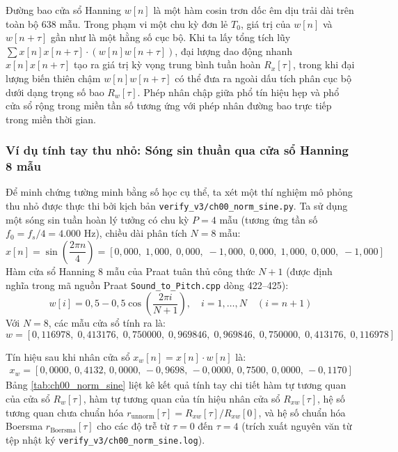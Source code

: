 Đường bao cửa sổ Hanning $w[n]$ là một hàm cosin trơn dốc êm dịu trải dài trên toàn bộ 638 mẫu. Trong phạm vi một chu kỳ đơn lẻ $T_0$, giá trị của $w[n]$ và $w[n+\tau]$ gần như là một hằng số cục bộ. Khi ta lấy tổng tích lũy $\sum x[n] x[n+\tau] \cdot (w[n] w[n+\tau])$, đại lượng dao động nhanh $x[n] x[n+\tau]$ tạo ra giá trị kỳ vọng trung bình tuần hoàn $R_x[\tau]$, trong khi đại lượng biến thiên chậm $w[n] w[n+\tau]$ có thể đưa ra ngoài dấu tích phân cục bộ dưới dạng trọng số bao $R_w[\tau]$. Phép nhân chập giữa phổ tín hiệu hẹp và phổ cửa sổ rộng trong miền tần số tương ứng với phép nhân đường bao trực tiếp trong miền thời gian.

\subsubsection*{Ví dụ tính tay thu nhỏ: Sóng sin thuần qua cửa sổ Hanning 8 mẫu}
Để minh chứng tường minh bằng số học cụ thể, ta xét một thí nghiệm mô phỏng thu nhỏ được thực thi bởi kịch bản \texttt{verify\_v3/ch00\_norm\_sine.py}. Ta sử dụng một sóng sin tuần hoàn lý tưởng có chu kỳ $P = 4$ mẫu (tương ứng tần số $f_0 = f_s / 4 = 4.000\text{ Hz}$), chiều dài phân tích $N = 8$ mẫu:
\begin{equation}
x[n] = \sin\left(\frac{2\pi n}{4}\right) = [0{,}000, \; 1{,}000, \; 0{,}000, \; -1{,}000, \; 0{,}000, \; 1{,}000, \; 0{,}000, \; -1{,}000]
\end{equation}
Hàm cửa sổ Hanning 8 mẫu của Praat tuân thủ công thức $N+1$ (được định nghĩa trong mã nguồn Praat \texttt{Sound\_to\_Pitch.cpp} dòng 422--425):
\begin{equation}
w[i] = 0{,}5 - 0{,}5 \cos\left(\frac{2\pi i}{N+1}\right), \quad i = 1, \dots, N \quad (i = n + 1)
\end{equation}
Với $N=8$, các mẫu cửa sổ tính ra là:
\begin{equation*}
w = [0{,}116978, \; 0{,}413176, \; 0{,}750000, \; 0{,}969846, \; 0{,}969846, \; 0{,}750000, \; 0{,}413176, \; 0{,}116978]
\end{equation*}

Tín hiệu sau khi nhân cửa sổ $x_w[n] = x[n] \cdot w[n]$ là:
\begin{align*}
x_w = [0{,}0000, \, 0{,}4132, \, 0{,}0000, \, -0{,}9698, \, -0{,}0000, \, 0{,}7500, \, 0{,}0000, \, -0{,}1170]
\end{align*}
Bảng \ref{tab:ch00_norm_sine} liệt kê kết quả tính tay chi tiết hàm tự tương quan của cửa sổ $R_w[\tau]$, hàm tự tương quan của tín hiệu nhân cửa sổ $R_{xw}[\tau]$, hệ số tương quan chưa chuẩn hóa $r_{\text{unnorm}}[\tau] = R_{xw}[\tau] / R_{xw}[0]$, và hệ số chuẩn hóa Boersma $r_{\text{Boersma}}[\tau]$ cho các độ trễ từ $\tau = 0$ đến $\tau = 4$ (trích xuất nguyên văn từ tệp nhật ký \texttt{verify\_v3/}\linebreak[0]\texttt{ch00\_norm\_sine.log}).

